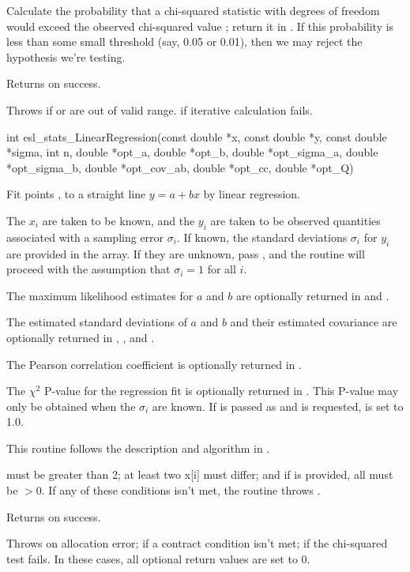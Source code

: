 \begin{sreapi}
Calculate the probability that a chi-squared statistic
with  degrees of freedom would exceed the observed
chi-squared value ; return it in . If
this probability is less than some small threshold (say,
0.05 or 0.01), then we may reject the hypothesis we're
testing.

Returns  on success.

Throws  if  or  are out of valid range.
 if iterative calculation fails.


\hypertarget{func:esl_stats_LinearRegression()}
{\item[int esl\_stats\_LinearRegression(const double *x, const double *y, const double *sigma, int n,
			   double *opt\_a,       double *opt\_b,
			   double *opt\_sigma\_a, double *opt\_sigma\_b, double *opt\_cov\_ab,
			   double *opt\_cc,      double *opt\_Q)]}

Fit  points ,  to a straight line
$y = a + bx$ by linear regression. 

The $x_i$ are taken to be known, and the $y_i$ are taken
to be observed quantities associated with a sampling
error $\sigma_i$. If known, the standard deviations
$\sigma_i$ for $y_i$ are provided in the  array.
If they are unknown, pass , and the
routine will proceed with the assumption that $\sigma_i
= 1$ for all $i$.

The maximum likelihood estimates for $a$ and $b$ are
optionally returned in  and .

The estimated standard deviations of $a$ and $b$ and
their estimated covariance are optionally returned in
, , and .

The Pearson correlation coefficient is optionally
returned in . 

The $\chi^2$ P-value for the regression fit is
optionally returned in . This P-value may only be
obtained when the $\sigma_i$ are known. If  is
passed as  and  is requested,  is
set to 1.0.

This routine follows the description and algorithm in
\citep[pp.661-666]{Press93}.

 must be greater than 2; at least two x[i] must
differ; and if  is provided, all  must
be $>0$. If any of these conditions isn't met, the
routine throws .

Returns  on success.

Throws  on allocation error;
 if a contract condition isn't met;
 if the chi-squared test fails.
In these cases, all optional return values are set to 0.


\end{sreapi}

